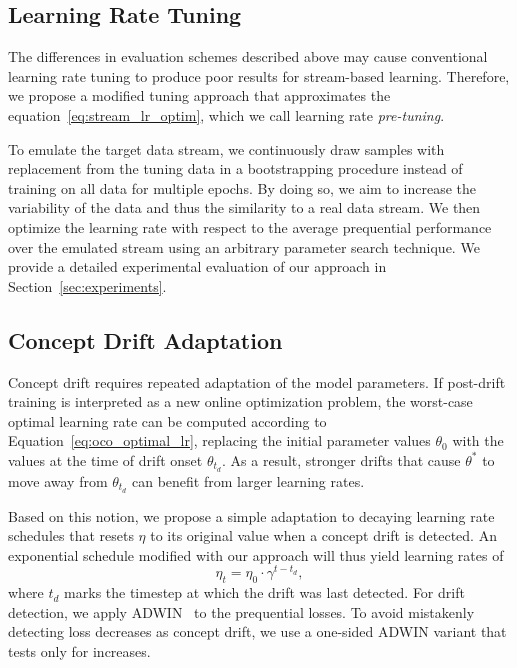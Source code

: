 \documentclass[runningheads]{llncs}
\begin{document}
\subsection{Learning Rate Tuning}\label{subsec:pre-tuning}

The differences in evaluation schemes described above may cause conventional learning rate tuning to produce poor results for stream-based learning.
Therefore, we propose a modified tuning approach that approximates the equation~\eqref{eq:stream_lr_optim}, which we call learning rate \textit{pre-tuning}.

To emulate the target data stream, we continuously draw samples with replacement from the tuning data in a bootstrapping procedure instead of training on all data for multiple epochs.
By doing so, we aim to increase the variability of the data and thus the similarity to a real data stream.
We then optimize the learning rate with respect to the average prequential performance over the emulated stream using an arbitrary parameter search technique.
We provide a detailed experimental evaluation of our approach in Section~\ref{sec:experiments}.

\subsection{Concept Drift Adaptation}

Concept drift requires repeated adaptation of the model parameters.
If post-drift training is interpreted as a new online optimization problem, the worst-case optimal learning rate can be computed according to Equation~\ref{eq:oco_optimal_lr}, replacing the initial parameter values $\theta_0$ with the values at the time of drift onset $\theta_{t_d}$.
As a result, stronger drifts that cause $\theta^*$ to move away from $\theta_{t_d}$ can benefit from larger learning rates.

Based on this notion, we propose a simple adaptation to decaying learning rate schedules that resets $\eta$ to its original value when a concept drift is detected.
An exponential schedule modified with our approach will thus yield learning rates of
\begin{equation}
	\eta_t = \eta_0 \cdot \gamma^{t-t_d},
\end{equation}\label{eq:drift_reset}
where $t_d$ marks the timestep at which the drift was last detected.
For drift detection, we apply ADWIN~\cite{bifetLearningTimeChangingData2007} to the prequential losses.
To avoid mistakenly detecting loss decreases as concept drift, we use a one-sided ADWIN variant that tests only for increases.
\end{document}
